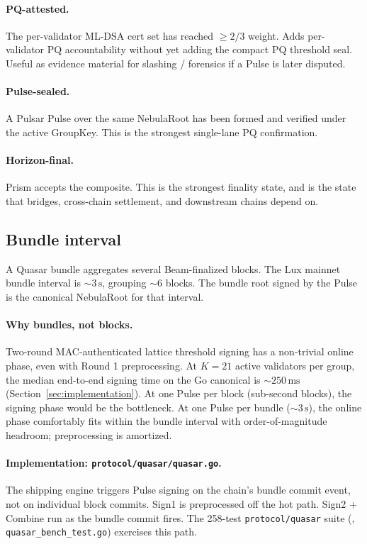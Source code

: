 \paragraph{PQ-attested.} The per-validator ML-DSA cert set has reached $\geq 2/3$ weight. Adds per-validator PQ accountability without yet adding the compact PQ threshold seal. Useful as evidence material for slashing / forensics if a Pulse is later disputed.

\paragraph{Pulse-sealed.} A Pulsar Pulse over the same NebulaRoot has been formed and verified under the active GroupKey. This is the strongest single-lane PQ confirmation.

\paragraph{Horizon-final.} Prism accepts the composite. This is the strongest finality state, and is the state that bridges, cross-chain settlement, and downstream chains depend on.

\subsection{Bundle interval}

A Quasar bundle aggregates several Beam-finalized blocks. The Lux mainnet bundle interval is $\sim 3\,\mathrm{s}$, grouping $\sim 6$ blocks. The bundle root signed by the Pulse is the canonical NebulaRoot for that interval.

\paragraph{Why bundles, not blocks.} Two-round MAC-authenticated lattice threshold signing has a non-trivial online phase, even with Round 1 preprocessing. At $K = 21$ active validators per group, the median end-to-end signing time on the Go canonical is $\sim 250\,\mathrm{ms}$ (Section~\ref{sec:implementation}). At one Pulse per block (sub-second blocks), the signing phase would be the bottleneck. At one Pulse per bundle ($\sim 3\,\mathrm{s}$), the online phase comfortably fits within the bundle interval with order-of-magnitude headroom; preprocessing is amortized.

\paragraph{Implementation: \texttt{protocol/quasar/quasar.go}.} The shipping engine triggers Pulse signing on the chain's bundle commit event, not on individual block commits. Sign1 is preprocessed off the hot path. Sign2 + Combine run as the bundle commit fires. The 258-test \texttt{protocol/quasar} suite (\cite{consensusgo}, \texttt{quasar\_bench\_test.go}) exercises this path.

